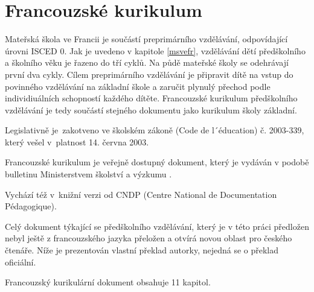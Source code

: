 	\section{Francouzské kurikulum}
	\label{frkurikulum}

		Mateřská škola ve Francii je součástí preprimárního vzdělávání, odpovídající úrovni ISCED 0. Jak je uvedeno v kapitole \ref{msvefr}, vzdělávání dětí předškolního a školního věku je řazeno do tří cyklů. Na půdě mateřské školy se odehrávají první dva cykly. Cílem preprimárního vzdělávání je připravit dítě na vstup do povinného vzdělávání na základní škole a  zaručit plynulý přechod podle individiuálních schopností každého dítěte. Francouzské kurikulum předškolního vzdělávání je tedy součástí stejného dokumentu jako kurikulum školy základní. 

		Legislativně je zakotveno ve školském zákoně (Code de l´éducation) č. 2003-339, který vešel v platnost 14. června 2003.
	
		Francouzské kurikulum je veřejně dostupný dokument, který je vydáván v podobě bulletinu Ministerstvem školství a výzkumu \citep{buletin}.

		Vychází též v knižní verzi od CNDP (Centre National de Documentation Pédagogique)\citep{CNDP}.

		Celý dokument týkající se předškolního vzdělávání, který je v této práci předložen nebyl ještě z francouzského jazyka přeložen a otvírá novou oblast pro českého čtenáře. Níže je prezentován vlastní překlad autorky, nejedná se o překlad oficiální. 

		Francouzský kurikulární dokument obsahuje 11 kapitol. 

